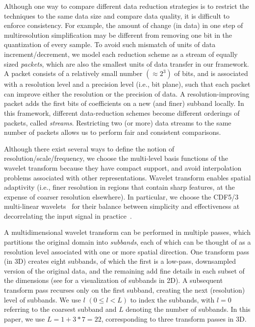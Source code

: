 Although one way to compare different data reduction strategies is to restrict the techniques to the
same data size and compare data quality, it is difficult to enforce consistency. For example, the
amount of change (in data) in one step of multiresolution simplification may be different from
removing one bit in the quantization of every sample. To avoid such mismatch of units of data
increment/decrement, we model each reduction scheme as a stream of equally sized \emph{packets},
which are also the smallest units of data transfer in our framework. A packet consists of a
relatively small number $\left(\approx 2^3\right)$ of bits, and is associated with a resolution
level and a precision level (i.e., bit plane), such that each packet can improve either the
resolution or the precision of data. A resolution-improving packet adds the first bits of
coefficients on a new (and finer) subband locally. In this framework, different data-reduction
schemes become different orderings of packets, called \emph{streams}. Restricting two (or more) data
streams to the same number of packets allows us to perform fair and consistent comparisons.

Although there exist several ways to define the notion of resolution/scale/frequency, we choose the
multi-level basis functions of the wavelet transform because they have compact support, and avoid
interpolation problems associated with other representations. Wavelet transform enables spatial
adaptivity (i.e., finer resolution in regions that contain sharp features, at the expense of coarser
resolution elsewhere). In particular, we choose the CDF5/3 multi-linear wavelets~\cite{cdf-wavelets}
for their balance between simplicity and effectiveness at decorrelating the input signal in
practice~\cite{jpeg2000}.

A multidimensional wavelet transform can be performed in multiple passes, which partitions the
original domain into \emph{subbands}, each of which can be thought of as a resolution level
associated with one or more spatial direction. One transform pass (in 3D) creates eight subbands, of
which the first is a low-pass, downsampled version of the original data, and the remaining add fine
details in each subset of the dimensions (see  for a visualization of subbands in
2D). A subsequent transform pass recurses only on the first subband, creating the next (resolution)
level of subbands. We use $l$ $(0 \leq l < L)$ to index the subbands, with $l = 0$ referring to the
coarsest subband and $L$ denoting the number of subbands. In this paper, we use $L=1 + 3*7=22$,
corresponding to three transform passes in 3D.

